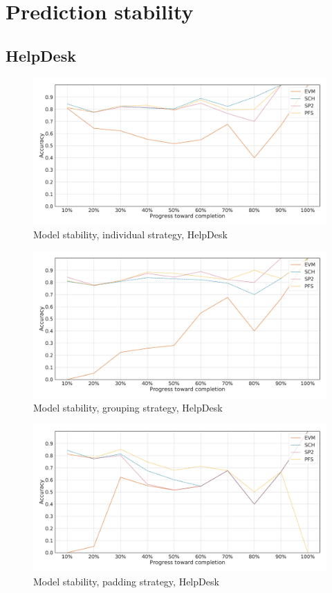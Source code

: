 \chapter{Prediction stability}
\label{appendix:evaluation-measurements}

\section*{HelpDesk}
\begin{figure}[!htb]
    \centering
    \includegraphics[width=\textwidth]{gfx/helpdesk/individual_stability.pdf}
    \caption{Model stability, individual strategy, HelpDesk}
    \label{fig:helpdesk-individual-stability}
\end{figure}
\begin{figure}[!htb]
    \centering
    \includegraphics[width=\textwidth]{gfx/helpdesk/grouped_stability.pdf}
    \caption{Model stability, grouping strategy, HelpDesk}
    \label{fig:helpdesk-grouped-stability}
\end{figure}
\begin{figure}[!htb]
    \centering
    \includegraphics[width=\textwidth]{gfx/helpdesk/padded_stability.pdf}
    \caption{Model stability, padding strategy, HelpDesk}
    \label{fig:helpdesk-padded-stability}
\end{figure}
